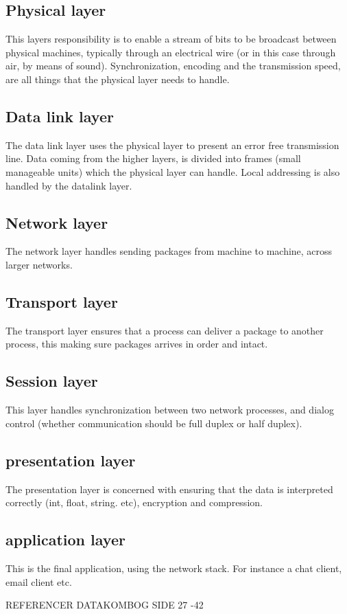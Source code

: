 \subsection{Physical layer}
This layers responsibility is to enable a stream of bits to be broadcast between physical machines, typically through an electrical wire (or in this case through air, by means of sound). Synchronization, encoding and the transmission speed, are all things that the physical layer needs to handle.

\subsection{Data link layer}
The data link layer uses the physical layer to present an error free transmission line. Data coming from the higher layers, is divided into frames (small manageable units) which the physical layer can handle. Local addressing is also handled by the datalink layer.

\subsection{Network layer}
The network layer handles sending packages from machine to machine, across larger networks.

\subsection{Transport layer}
The transport layer ensures that a process can deliver a package to another process, this making sure packages arrives in order and intact.

\subsection{Session layer}
This layer handles synchronization between two network processes, and dialog control (whether communication should be full duplex or half duplex).

\subsection{presentation layer}
The presentation layer is concerned with ensuring that the data is interpreted correctly (int, float, string. etc), encryption and compression.

\subsection{application layer}
This is the final application, using the network stack. For instance a chat client, email client etc.

REFERENCER DATAKOMBOG SIDE 27 -42